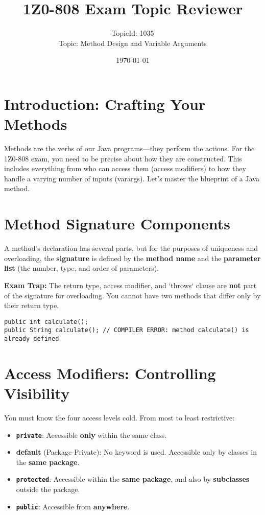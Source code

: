 \documentclass[12pt]{article}
\title{\textbf{1Z0-808 Exam Topic Reviewer}}
\author{TopicId: 1035 \\ Topic: Method Design and Variable Arguments}
\date{\today}
\begin{document}
\maketitle
\newpage\begin{enumerate}[label=(\arabic*)]
\section*{Introduction: Crafting Your Methods}
Methods are the verbs of our Java programs---they perform the actions. For the 1Z0-808 exam, you need to be precise about how they are constructed. This includes everything from who can access them (access modifiers) to how they handle a varying number of inputs (varargs). Let's master the blueprint of a Java method.

\section{Method Signature Components}
A method's declaration has several parts, but for the purposes of uniqueness and overloading, the \textbf{signature} is defined by the \textbf{method name} and the \textbf{parameter list} (the number, type, and order of parameters). 

\textbf{Exam Trap:} The return type, access modifier, and `throws` clause are \textbf{not} part of the signature for overloading. You cannot have two methods that differ only by their return type.
\begin{verbatim}
public int calculate();
public String calculate(); // COMPILER ERROR: method calculate() is already defined
\end{verbatim}

\section{Access Modifiers: Controlling Visibility}
You must know the four access levels cold. From most to least restrictive:
\begin{itemize}
    \item \texttt{\textbf{private}}: Accessible \textbf{only} within the same class.
    \item \textbf{default} (Package-Private): No keyword is used. Accessible only by classes in the \textbf{same package}.
    \item \texttt{\textbf{protected}}: Accessible within the \textbf{same package}, and also by \textbf{subclasses} outside the package.
    \item \texttt{\textbf{public}}: Accessible from \textbf{anywhere}.
\end{itemize}


\end{enumerate}
\end{document}
